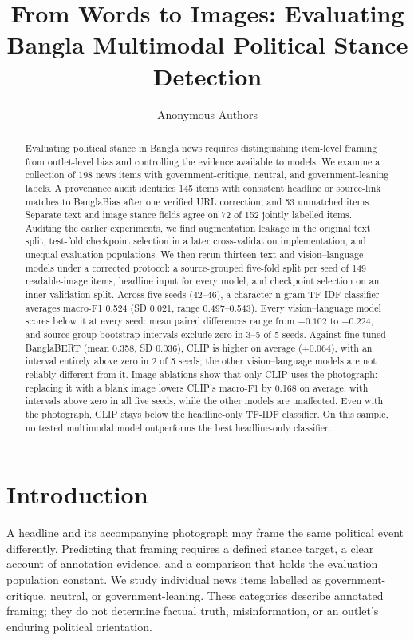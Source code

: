 \documentclass[11pt]{article}
\title{From Words to Images: Evaluating Bangla Multimodal Political Stance Detection}
\author{Anonymous Authors}
\begin{document}
\maketitle
\begin{abstract}
Evaluating political stance in Bangla news requires distinguishing item-level framing from outlet-level bias and controlling the evidence available to models. We examine a collection of 198 news items with government-critique, neutral, and government-leaning labels. A provenance audit identifies 145 items with consistent headline or source-link matches to BanglaBias after one verified URL correction, and 53 unmatched items. Separate text and image stance fields agree on 72 of 152 jointly labelled items. Auditing the earlier experiments, we find augmentation leakage in the original text split, test-fold checkpoint selection in a later cross-validation implementation, and unequal evaluation populations. We then rerun thirteen text and vision--language models under a corrected protocol: a source-grouped five-fold split per seed of 149 readable-image items, headline input for every model, and checkpoint selection on an inner validation split. Across five seeds (42--46), a character n-gram TF-IDF classifier averages macro-F1 0.524 (SD 0.021, range 0.497--0.543). %
Every vision--language model scores below it at every seed: mean paired differences range from $-0.102$ to $-0.224$, and source-group bootstrap intervals exclude zero in 3--5 of 5 seeds. Against fine-tuned BanglaBERT (mean 0.358, SD 0.036), CLIP is higher on average ($+0.064$), with an interval entirely above zero in 2 of 5 seeds; the other vision--language models are not reliably different from it. Image ablations show that only CLIP uses the photograph: replacing it with a blank image lowers CLIP's macro-F1 by 0.168 on average, with intervals above zero in all five seeds, while the other models are unaffected. %
Even with the photograph, CLIP stays below the headline-only TF-IDF classifier. On this sample, no tested multimodal model outperforms the best headline-only classifier.
\end{abstract}

\section{Introduction}
A headline and its accompanying photograph may frame the same political event differently. Predicting that framing requires a defined stance target, a clear account of annotation evidence, and a comparison that holds the evaluation population constant. We study individual news items labelled as government-critique, neutral, or government-leaning. These categories describe annotated framing; they do not determine factual truth, misinformation, or an outlet's enduring political orientation.
\end{document}
